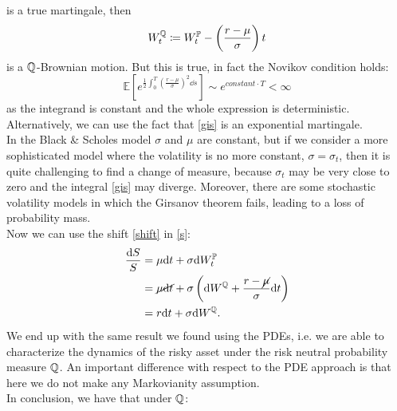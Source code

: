 is a true martingale, then
\begin{equation}\label{shift}
    W^{\mathbb{Q}}_t \coloneqq W_t^{\mathbb{P}} - \left(\frac{r-\mu}{\sigma}\right)t
\end{equation}
is a $\mathbb{Q}$-Brownian motion. But this is true, in fact the Novikov condition holds:
\begin{equation}
    \mathbb{E}\left[e^{\frac{1}{2}\int^T_0\left(\frac{r-\mu}{\sigma}\right)^2\dd s}\right] \sim e^{constant\cdot T} < \infty
\end{equation}
as the integrand is constant and the whole expression is deterministic. Alternatively, we can use the fact that \eqref{gis} is an exponential martingale. \\
In the Black \& Scholes model $\sigma$ and $\mu$ are constant, but if we consider a more sophisticated model where the volatility is no more constant, $\sigma=\sigma_t$, then it is quite challenging to find a change of measure, because $\sigma_t$ may be very close to zero and the integral \eqref{gis} may diverge. Moreover, there are some stochastic volatility models in which the Girsanov theorem fails, leading to a loss of probability mass. \\
Now we can use the shift \eqref{shift} in \eqref{s}:
\begin{align}
    \notag \frac{\dd S}{S} &= \mu \dd t + \sigma \dd W_t^{\mathbb{P}}\\
    &=
    \cancel{\mu \dd t} + \sigma \left(\dd W^{\mathbb{Q}} + \frac{r-\cancel{\mu}}{\sigma}\dd t\right) \\
    &=
    r\dd t + \sigma\dd W^{\mathbb{Q}}.
\end{align}
We end up with the same result we found using the PDEs, i.e. we are able to characterize the dynamics of the risky asset under the risk neutral probability measure $\mathbb{Q}$. An important difference with respect to the PDE approach is that here we do not make any Markovianity assumption.\\
In conclusion, we have that under $\mathbb{Q}$:
